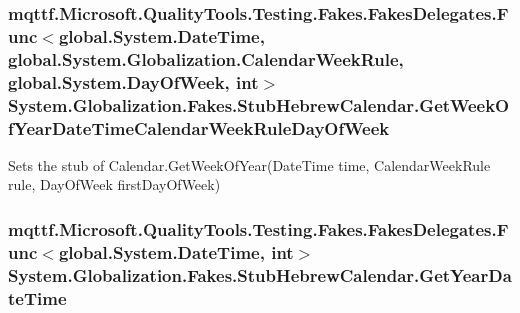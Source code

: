 \hypertarget{class_system_1_1_globalization_1_1_fakes_1_1_stub_hebrew_calendar_a073e9c0685d13994575e8d273bdc8bd2}{
\subsubsection[{Get\-Week\-Of\-Year\-Date\-Time\-Calendar\-Week\-Rule\-Day\-Of\-Week}]{\setlength{\rightskip}{0pt plus 5cm}mqttf.\-Microsoft.\-Quality\-Tools.\-Testing.\-Fakes.\-Fakes\-Delegates.\-Func$<$global.\-System.\-Date\-Time, global.\-System.\-Globalization.\-Calendar\-Week\-Rule, global.\-System.\-Day\-Of\-Week, int$>$ System.\-Globalization.\-Fakes.\-Stub\-Hebrew\-Calendar.\-Get\-Week\-Of\-Year\-Date\-Time\-Calendar\-Week\-Rule\-Day\-Of\-Week}}\label{class_system_1_1_globalization_1_1_fakes_1_1_stub_hebrew_calendar_a073e9c0685d13994575e8d273bdc8bd2}


Sets the stub of Calendar.\-Get\-Week\-Of\-Year(\-Date\-Time time, Calendar\-Week\-Rule rule, Day\-Of\-Week first\-Day\-Of\-Week)

\hypertarget{class_system_1_1_globalization_1_1_fakes_1_1_stub_hebrew_calendar_a2dc6e1741fe777469ff86d2a6ab01ddc}{
\subsubsection[{Get\-Year\-Date\-Time}]{\setlength{\rightskip}{0pt plus 5cm}mqttf.\-Microsoft.\-Quality\-Tools.\-Testing.\-Fakes.\-Fakes\-Delegates.\-Func$<$global.\-System.\-Date\-Time, int$>$ System.\-Globalization.\-Fakes.\-Stub\-Hebrew\-Calendar.\-Get\-Year\-Date\-Time}}\label{class_system_1_1_globalization_1_1_fakes_1_1_stub_hebrew_calendar_a2dc6e1741fe777469ff86d2a6ab01ddc}


